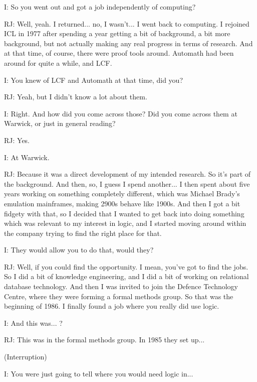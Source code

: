 \documentclass[10pt,titlepage]{book}
\begin{document}
I: So you went out and got a job independently of computing?

RJ: Well, yeah. I returned... no, I wasn't... I went back to computing. I rejoined ICL in 1977 after spending a year getting a bit of background, a bit more background, but not actually making any real progress in terms of research. And at that time, of course, there were proof tools around. Automath had been around for quite a while, and LCF.

I: You knew of LCF and Automath at that time, did you?

RJ: Yeah, but I didn't know a lot about them.

I: Right. And how did you come across those? Did you come across them at Warwick, or just in general reading?

RJ: Yes.

I: At Warwick.

RJ: Because it was a direct development of my intended research. So it's part of the background. And then, so, I guess I spend another... I then spent about five years working on something completely different, which was Michael Brady's emulation mainframes, making 2900s behave like 1900s. And then I got a bit fidgety with that, so I decided that I wanted to get back into doing something which was relevant to my interest in logic, and I started moving around within the company trying to find the right place for that.

I: They would allow you to do that, would they?

RJ: Well, if you could find the opportunity. I mean, you've got to find the jobs. So I did a bit of knowledge engineering, and I did a bit of working on relational database technology. And then I was invited to join the Defence Technology Centre, where they were forming a formal methods group. So that was the beginning of 1986. I finally found a job where you really did use logic.

I: And this was... ?

RJ: This was in the formal methods group. In 1985 they set up...

(Interruption)

I: You were just going to tell where you would need logic in...
\end{document}
